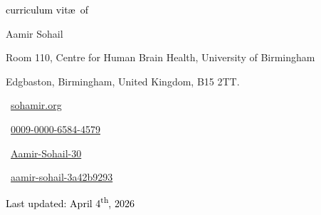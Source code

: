 \begin{scriptsize}
	 \textcolor{black}{curriculum vit\ae~of}
\end{scriptsize}

\begin{Large} 
	Aamir Sohail
\end{Large}

\vspace*{0.4em}
\begin{scshape}
	\begin{scriptsize}
		  \textcolor{highlight2}{Room 110, Centre for Human Brain Health, University of Birmingham}
		  
		  \vspace*{-1ex}
		  \textcolor{highlight2}{Edgbaston,
		  	Birmingham, United Kingdom, B15 2TT.}
	\end{scriptsize}
\end{scshape}
\vspace*{0.25cm}

\begin{footnotesize}
	\begin{tiny}\faHome\end{tiny}~\href{https://sohamir.org}
	{sohamir.org
	}
	\quad {} 
	
	
	\begin{tiny}\aiOrcid\end{tiny}~\href{https://orcid.org/my-orcid?emailVerified=true&orcid=0009-0000-6584-4579}{0009-0000-6584-4579}
	\quad 
	\begin{tiny}\aiResearchGate\end{tiny}~\href{https://www.researchgate.net/profile/Aamir-Sohail-30}{Aamir-Sohail-30}
		\quad
	\begin{tiny}\faLinkedin\end{tiny}~\href{https://www.linkedin.com/in/aamir-sohail-3a42b9293}{aamir-sohail-3a42b9293}
	

\end{footnotesize}

\vspace*{0cm}
\begin{center}
\textcolor{black}{\small{Last updated: April 4\textsuperscript{th}, 2026}}
\end{center}